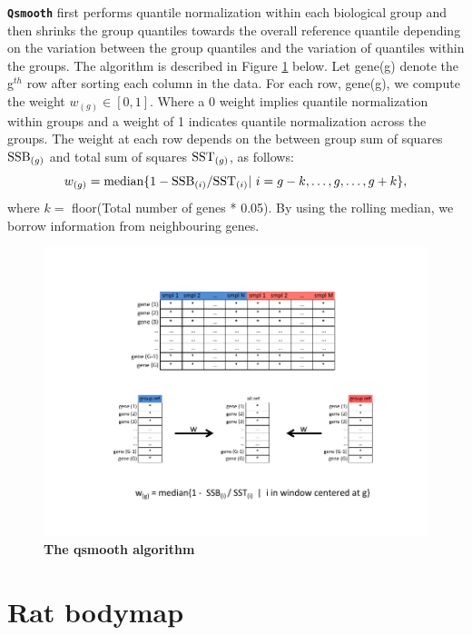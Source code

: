 \documentclass{article}\usepackage[]{graphicx}\usepackage[usenames,dvipsnames]{color}
\begin{document}
\texttt{\bf{Qsmooth}} first performs quantile normalization within 
each biological group and then shrinks the group quantiles
towards the overall reference quantile depending on the variation 
between the group quantiles and the variation of quantiles 
within the groups. 
The algorithm is described in Figure \ref{algo}
below. Let gene(g) denote the g${}^{th}$ row after sorting each 
column in the data. 
For each row, gene(g), we compute the weight $w_{(g)} \in [0, 1]$.
Where a 0 weight implies quantile normalization within groups and
a weight of 1 indicates quantile normalization across the groups.
The weight at each row depends on the between group sum of squares
$\hbox{SSB}_{(g)}$ and total sum of squares $\hbox{SST}_{(g)}$, 
as follows:
\begin{equation}
w_{(g)} = \hbox{median} \{1 - \hbox{SSB}_{(i)} / \hbox{SST}_{(i)} | ~i = g-k, \dots, g, \dots, g+k \},
\end{equation}
where $k=$ floor(Total number of genes * 0.05). 
By using the rolling median, we borrow information from neighbouring
genes.

\begin{figure}[!h]
\begin{center}
\includegraphics[width=\columnwidth]{qsmooth_algo.pdf}
\end{center}
\small\normalsize
\caption[qsmooth algorithm]
         {{\bf The qsmooth algorithm}}
\label{algo}
\end{figure}

\section{Rat bodymap}
\end{document}
